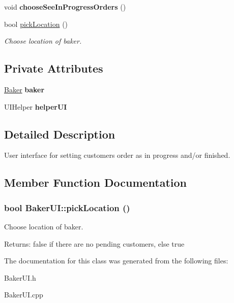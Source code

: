 \begin{CompactItemize}
\item 
\hypertarget{class_baker_u_i_8a3e4f702e7acee5575bbbc949c7fa6d}{
void {\bf choose\-See\-In\-Progress\-Orders} ()}
\label{class_baker_u_i_8a3e4f702e7acee5575bbbc949c7fa6d}

\item 
bool \hyperlink{class_baker_u_i_74d0d6b7d7493e8a9703bc8fbeb79f2e}{pick\-Location} ()
\begin{CompactList}\small\item\em Choose location of baker. \item\end{CompactList}\end{CompactItemize}
\subsection*{Private Attributes}
\begin{CompactItemize}
\item 
\hypertarget{class_baker_u_i_623466d63908ff643b88d946e2f2fbd6}{
\hyperlink{class_baker}{Baker} {\bf baker}}
\label{class_baker_u_i_623466d63908ff643b88d946e2f2fbd6}

\item 
\hypertarget{class_baker_u_i_165ca02db075e280199e0970e3465900}{
UIHelper {\bf helper\-UI}}
\label{class_baker_u_i_165ca02db075e280199e0970e3465900}

\end{CompactItemize}


\subsection{Detailed Description}
User interface for setting customers order as in progress and/or finished. 



\subsection{Member Function Documentation}
\hypertarget{class_baker_u_i_74d0d6b7d7493e8a9703bc8fbeb79f2e}{
\subsubsection[pickLocation]{\setlength{\rightskip}{0pt plus 5cm}bool Baker\-UI::pick\-Location ()}}
\label{class_baker_u_i_74d0d6b7d7493e8a9703bc8fbeb79f2e}


Choose location of baker. 

\begin{Desc}
\item[Returns:]false if there are no pending customers, else true \end{Desc}


The documentation for this class was generated from the following files:\begin{CompactItemize}
\item 
Baker\-UI.h\item 
Baker\-UI.cpp\end{CompactItemize}
